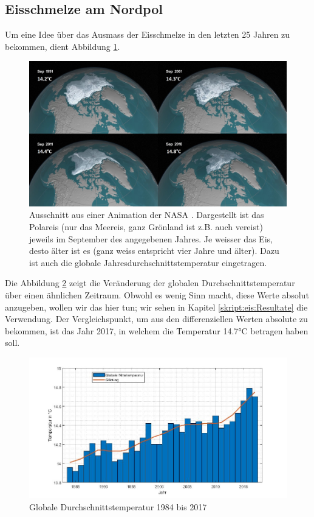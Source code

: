 \begin{refsection}
\subsection{Eisschmelze am Nordpol}
Um eine Idee über das Ausmass der Eisschmelze in den letzten 25 Jahren zu bekommen, dient Abbildung \ref{skript:eis:fig:NASAohne}.
\begin{figure}
	\centering
	\includegraphics[width=14cm]{eis/NASA_ohne_Breitengraden.jpg}
	\caption{Ausschnitt aus einer Animation der NASA \cite{skript:eis:animation_NASA}. Dargestellt ist das Polareis (nur das Meereis, ganz Grönland ist z.B. auch vereist) jeweils im September des angegebenen Jahres. Je weisser das Eis, desto älter ist es (ganz weiss entspricht vier Jahre und älter).	Dazu ist auch die globale Jahresdurchschnittstemperatur eingetragen.}
	\label{skript:eis:fig:NASAohne}
\end{figure}
Die Abbildung \ref{skript:eis:fig:globale_Mitteltemperaturen} zeigt die Veränderung der globalen Durchschnittstemperatur über einen ähnlichen Zeitraum. Obwohl es wenig Sinn macht, diese Werte absolut anzugeben, wollen wir das hier tun; wir sehen in Kapitel \ref{skript:eis:Resultate} die Verwendung. Der Vergleichspunkt, um aus den differenziellen Werten \cite{skript:eis:vitalsign_NASA} absolute zu bekommen, ist das Jahr 2017, in welchem die Temperatur 14.7°C \cite{skript:eis:ref2017} betragen haben soll.
\begin{figure}
	\centering
	\includegraphics[width=14cm]{eis/globale_Mitteltemperaturen.jpg}
	\caption{Globale Durchschnittstemperatur 1984 bis 2017}
	\label{skript:eis:fig:globale_Mitteltemperaturen}
\end{figure}

\end{refsection}
